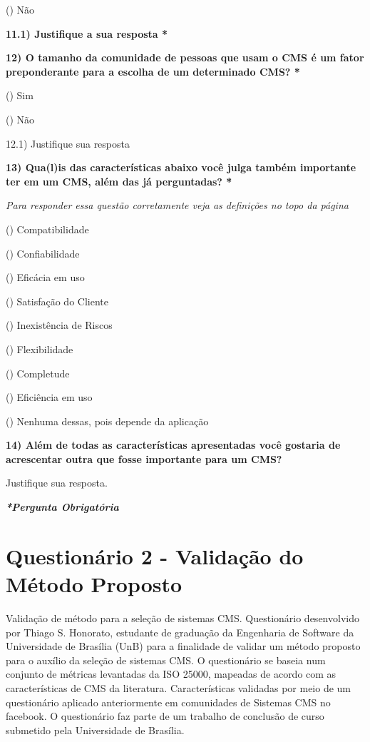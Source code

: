 \begin{apendicesenv}
() Não
 
\textbf{11.1) Justifique a sua resposta *}
 
\textbf{12) O tamanho da comunidade de pessoas que usam o CMS é um fator preponderante para a escolha de um determinado CMS? *}

()  Sim
  
() Não
 
12.1) Justifique sua resposta
 
\textbf{13) Qua(l)is das características abaixo você julga também importante ter em um CMS, além das já perguntadas? *}

\textit{Para responder essa questão corretamente veja as definições no topo da página}

()  Compatibilidade

() Confiabilidade

() Eficácia em uso

() Satisfação do Cliente

() Inexistência de Riscos

() Flexibilidade

() Completude

() Eficiência em uso

() Nenhuma dessas, pois depende da aplicação
 
\textbf{14) Além de todas as características apresentadas você gostaria de acrescentar outra que fosse importante para um CMS?}

Justifique sua resposta.

\textbf{\textit{*Pergunta Obrigatória}}
 
 
\section{Questionário 2 - Validação do Método Proposto }
\label{Questionário_2}

Validação de método para a seleção de sistemas CMS.
Questionário desenvolvido por Thiago S. Honorato, estudante de graduação da Engenharia de Software da Universidade de Brasília (UnB) para a finalidade de validar um método proposto para o auxílio da seleção de sistemas CMS. O questionário se baseia num conjunto de métricas levantadas da ISO 25000, mapeadas de acordo com as características de CMS da literatura. Características validadas por meio de um questionário aplicado anteriormente em comunidades de Sistemas CMS no facebook.
O questionário faz parte de um trabalho de conclusão de curso submetido pela Universidade de Brasília.



\end{apendicesenv}
